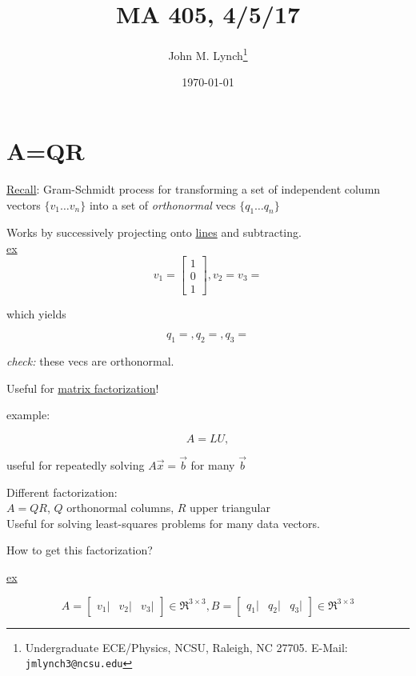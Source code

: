 \documentclass[twocolumn,draft]{article}
\title{MA 405, 4/5/17}
\author{John M. Lynch\footnote{Undergraduate ECE/Physics, NCSU, Raleigh, NC 27705. E-Mail: \texttt{jmlynch3@ncsu.edu}}}
\date{\today}
\begin{document}
  \maketitle
  \section*{A=QR}
  \underline{Recall}: Gram-Schmidt process for transforming a set of independent column vectors
  $\{v_{1}\ldots v_{n}\}$ into a set of \emph{orthonormal} vecs $\{q_{1}\ldots q_{n}\}$
  
  Works by successively projecting onto \underline{lines} and subtracting. \\
  
  \noindent \underline{ex}
  \begin{equation}
  	v_{1} = \begin{bmatrix}
				1 \\
				0 \\
				1
  			\end{bmatrix},
	v_{2} = %
	v_{3} = %
  \end{equation}
  
  which yields
  
  \begin{equation}
  	q_{1} = , q_{2} = , q_{3} = %
  \end{equation}
  
  \emph{check:} these vecs are orthonormal.
  
  Useful for \underline{matrix factorization}!
  
  example:
  
  \begin{equation}
  	A=LU,
  \end{equation}
  
  useful for repeatedly solving $A\vec{x}=\vec{b}$ for many $\vec{b}$
  
  Different factorization: \\
  
  \noindent $A=QR$, $Q$ orthonormal columns, $R$ upper triangular \\
  
  \noindent Useful for solving least-squares problems for many data vectors.
  
  How to get this factorization?
  
  \underline{ex}
  
  \begin{equation}
  	A = \begin{bmatrix}
			v_{1}| & v_{2} | & v_{3} |
		\end{bmatrix}
	\in \Re^{3\times 3},
	B = \begin{bmatrix}
			q_{1}| & q_{2} | & q_{3} |
		\end{bmatrix}
	\in \Re^{3\times 3} %
  \end{equation}
  
\end{document}
